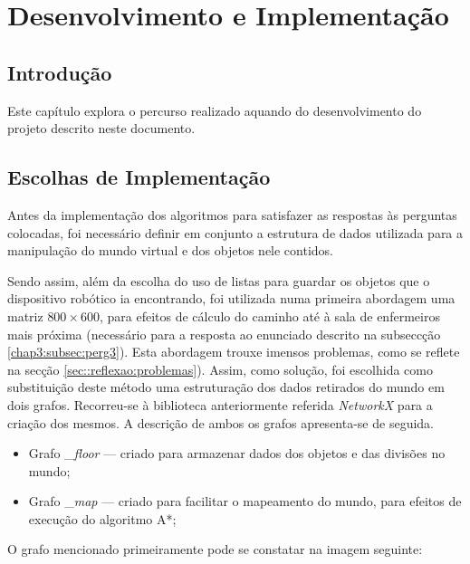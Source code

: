 \chapter{Desenvolvimento e Implementação}
\label{chap:imp-test}

\section{Introdução}
\label{chap3:sec:intro}
Este capítulo explora o percurso realizado aquando do desenvolvimento do projeto descrito neste documento.

\section{Escolhas de Implementação}
\label{chap3:sec:struct}

Antes da implementação dos algoritmos para satisfazer as respostas às perguntas colocadas, foi necessário definir em conjunto a estrutura de dados utilizada para a manipulação do mundo virtual e dos objetos nele contidos.

Sendo assim, além da escolha do uso de listas para guardar os objetos que o dispositivo robótico ia encontrando, foi utilizada numa primeira abordagem uma matriz $800\times600$, para efeitos de cálculo do caminho até à sala de enfermeiros mais próxima (necessário para a resposta ao enunciado descrito na subseccção \ref{chap3:subsec:perg3}). Esta abordagem trouxe imensos problemas, como se reflete na secção \ref{sec::reflexao:problemas}). Assim, como solução, foi escolhida como substituição deste método uma estruturação dos dados retirados do mundo em dois grafos. Recorreu-se à biblioteca anteriormente referida \emph{NetworkX} \cite{NetworkX} para a criação dos mesmos. A descrição de ambos os grafos apresenta-se de seguida.

\begin{itemize}
	\item Grafo \_\emph{floor} --- criado para armazenar dados dos objetos e das divisões no mundo;
	\item Grafo \_\emph{map} --- criado para facilitar o mapeamento do mundo, para efeitos de execução do algoritmo A*;
\end{itemize}

O grafo mencionado primeiramente pode se constatar na imagem seguinte:

\begin{figure}[!htb]
\centering
\end{figure}

